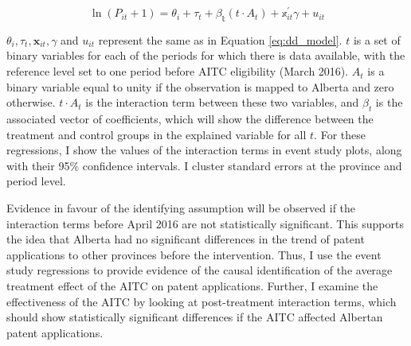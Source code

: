 \documentclass[../main.tex]{subfiles}
\begin{document}
\begin{equation}
    \label{eq:event_study}
   \ln(P_{it} + 1) = \theta_i + \tau_t + \mathbb{\beta_t}(t \cdot A_t) + \mathbb{x}_{it}^{'}\gamma + u_{it}
\end{equation}

$\theta_i, \tau_t, \mathbf{x}_{it}, \gamma$ and $u_{it}$ represent the same as in Equation \ref{eq:dd_model}. $t$ is a set of binary variables for each of the periods for which there is data available, with the reference level set to one period before AITC eligibility (March 2016). $A_t$ is a binary variable equal to unity if the observation is mapped to Alberta and zero otherwise. $t\cdot A_t$ is the interaction term between these two variables, and $\beta_t$ is the associated vector of coefficients, which will show the difference between the treatment and control groups in the explained variable for all $t$. For these regressions, I show the values of the interaction terms in event study plots, along with their 95\% confidence intervals. I cluster standard errors at the province and period level.  

Evidence in favour of the identifying assumption will be observed if the interaction terms before April 2016 are not statistically significant. This supports the idea that Alberta had no significant differences in the trend of patent applications to other provinces before the intervention. Thus, I use the event study regressions to provide evidence of the causal identification of the average treatment effect of the AITC on patent applications. Further, I examine the effectiveness of the AITC by looking at post-treatment interaction terms, which should show statistically significant differences if the AITC affected Albertan patent applications. 
\end{document}

